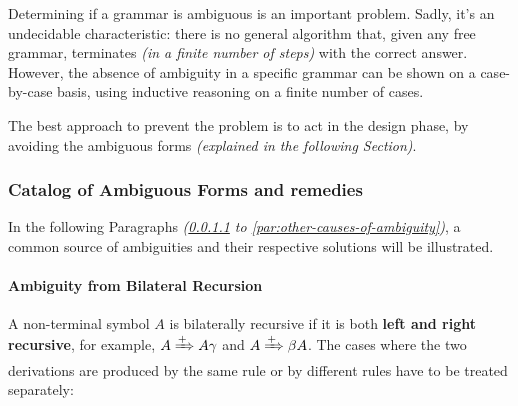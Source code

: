 \documentclass[english]{article}
\begin{document}
\bigskip
Determining if a grammar is ambiguous is an important problem.
Sadly, it's an undecidable characteristic: there is no general algorithm that, given any free grammar, terminates \textit{(in a finite number of steps)} with the correct answer.
However, the absence of ambiguity in a specific grammar can be shown on a case-by-case basis, using inductive reasoning on a finite number of cases.

The best approach to prevent the problem is to act in the design phase, by avoiding the ambiguous forms \textit{(explained in the following Section)}.

\subsubsection{Catalog of Ambiguous Forms and remedies}

In the following Paragraphs \textit{(\ref{par:ambiguity-from-bilateral-recursion} to \ref{par:other-causes-of-ambiguity})}, a common source of ambiguities and their respective solutions will be illustrated.

\paragraph{Ambiguity from Bilateral Recursion}
\label{par:ambiguity-from-bilateral-recursion}

A non-terminal symbol \(A\) is bilaterally recursive if it is both \textbf{left and right recursive}, for example, \(A \xRightarrow{+} A \gamma\) and \(A \xRightarrow{+} \beta A\).
The cases where the two derivations are produced by the same rule or by different rules have to be treated separately:
\end{document}
